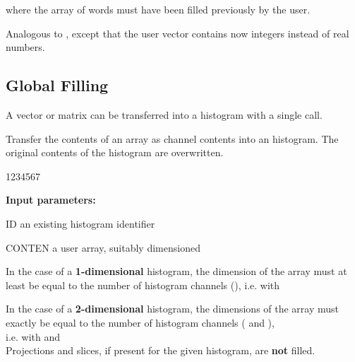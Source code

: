 where the array  of  words must have been filled
previously by the user.
\medskip
 
 
 
\Action 
Analogous to , except that the user vector contains now
integers instead of real numbers.
 
\subsection{Global Filling}
\label{HGLOBFIL}

A vector or matrix can be transferred into a histogram with a single call.
 
 
 
\Action 
Transfer the contents of an array as channel contents into an
histogram. The original contents of the histogram are overwritten.
 
\begin{DLttc}{1234567}
\item[{\rm\bf Input parameters:}]
\item[ID] an existing histogram identifier
\item[CONTEN] a user array, suitably dimensioned
\end{DLttc}
 
\Remark
 
\begin{UL}
\item In the case of a {\bf 1-dimensional} histogram, the dimension
      of the array must at least be equal to the number of
      histogram channels (), i.e.
       with 
\item In the case of a {\bf 2-dimensional} histogram, the dimensions
      of the array must exactly be equal to the number of
      histogram channels ( and ), \\
      i.e.  with  and 
      \\
      Projections and slices, if present for the given histogram,
      are {\bf not} filled.
\end{UL}
 
 
